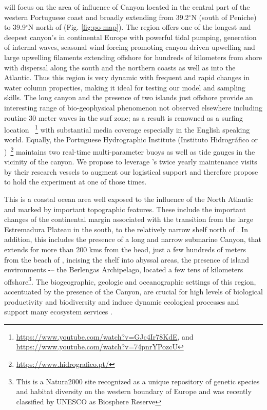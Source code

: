 \proj will focus on the area of influence of \naz Canyon located in
the central part of the western Portuguese coast and broadly extending
from 39.2$^{\circ}$N (south of Peniche) to 39.9$^{\circ}$N north of
\naz (Fig. \ref{fig:po-map}). The region offers one of the longest and
deepest canyon's in continental Europe with powerful tidal pumping,
generation of internal waves, seasonal wind forcing promoting canyon
driven upwelling and large upwelling filaments extending offshore for
hundreds of kilometers from shore with dispersal along the south and
the northern coasts as well as into the Atlantic.  Thus this region is
very dynamic with frequent and rapid changes in water column
properties, making it ideal for testing our model and sampling skills.
The long canyon and the presence of two islands just offshore provide
an interesting range of bio-geophysical phenomenon not observed
elsewhere including routine 30 meter waves in the surf zone; as a
result \naz is renowned as a surfing location
~\footnote{\url{https://www.youtube.com/watch?v=GJc4Ir78KdE}, and
  \url{https://www.youtube.com/watch?v=74pnrYPozcU}} with substantial
media coverage especially in the English speaking world.  Equally, the
Portuguese Hydrographic Institute (Instituto Hidrogr\'{a}fico or
\inste)~\footnote{\url{https://www.hidrografico.pt/}} maintains two
real-time multi-parameter buoys as well as tide gauges in the vicinity
of the canyon. We propose to leverage \inste's twice yearly
maintenance visits by their research vessels to augment our logistical
support and therefore propose to hold the experiment at one of those
times.

This is a coastal ocean area well exposed to the influence of the
North Atlantic and marked by important topographic features. These
include the important changes of the continental margin associated
with the transition from the large Estremadura Plateau in the south,
to the relatively narrow shelf north of \naze. In addition, this
includes the presence of a long and narrow submarine \naz Canyon, that
extends for more than 200 kms from the head, just a few hundreds of
meters from the beach of \naze, incising the shelf into abyssal areas,
the presence of island environments -– the Berlengas Archipelago,
located a few tens of kilometers offshore\footnote{This is a
  Natura2000 site recognized as a unique repository of genetic species
  and habitat diversity on the western boundary of Europe and was
  recently classified by UNESCO as Biosphere Reserve}. The
biogeographic, geologic and oceanographic settings of this region,
accentuated by the presence of the \naz Canyon, are crucial for high
levels of biological productivity and biodiversity and induce dynamic
ecological processes and support many ecosystem services
.  

